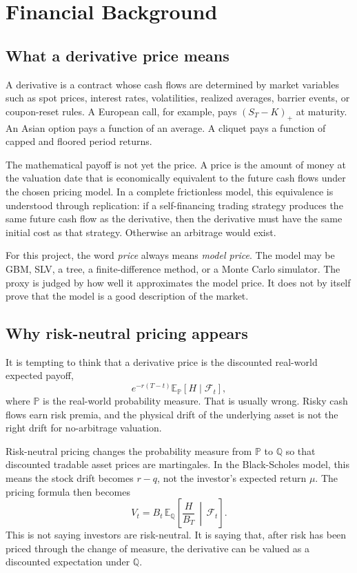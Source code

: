 \documentclass[11pt,oneside]{book}
\theoremstyle{definition}
\newcommand{\E}{\mathbb{E}}
\newcommand{\Q}{\mathbb{Q}}
\begin{document}
\chapter{Financial Background}

\section{What a derivative price means}
A derivative is a contract whose cash flows are determined by market variables such as spot prices, interest rates, volatilities, realized averages, barrier events, or coupon-reset rules. A European call, for example, pays \((S_T-K)_+\) at maturity. An Asian option pays a function of an average. A cliquet pays a function of capped and floored period returns.

The mathematical payoff is not yet the price. A price is the amount of money at the valuation date that is economically equivalent to the future cash flows under the chosen pricing model. In a complete frictionless model, this equivalence is understood through replication: if a self-financing trading strategy produces the same future cash flow as the derivative, then the derivative must have the same initial cost as that strategy. Otherwise an arbitrage would exist.

For this project, the word \emph{price} always means \emph{model price}. The model may be GBM, SLV, a tree, a finite-difference method, or a Monte Carlo simulator. The proxy is judged by how well it approximates the model price. It does not by itself prove that the model is a good description of the market.

\section{Why risk-neutral pricing appears}
It is tempting to think that a derivative price is the discounted real-world expected payoff,
\[
  e^{-r(T-t)}\E_{\mathbb P}[H\mid\mathcal F_t],
\]
where \(\mathbb P\) is the real-world probability measure. That is usually wrong. Risky cash flows earn risk premia, and the physical drift of the underlying asset is not the right drift for no-arbitrage valuation.

Risk-neutral pricing changes the probability measure from \(\mathbb P\) to \(\Q\) so that discounted tradable asset prices are martingales. In the Black-Scholes model, this means the stock drift becomes \(r-q\), not the investor's expected return \(\mu\). The pricing formula then becomes
\[
  V_t
  =
  B_t\,\E_\Q\!\left[\frac{H}{B_T}\,\middle|\,\mathcal F_t\right].
\]
This is not saying investors are risk-neutral. It is saying that, after risk has been priced through the change of measure, the derivative can be valued as a discounted expectation under \(\Q\).
\end{document}
